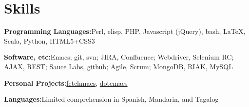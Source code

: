 \section{Skills}
%
\begin{position}
\item[] \textbf{Programming Languages:}\quad Perl, elisp, PHP, Javascript (jQuery), bash, \LaTeX, Scala, Python, HTML5+CSS3
\item[] \textbf{Software, etc:}\quad Emacs; git, svn; JIRA, Confluence; Webdriver, Selenium RC; AJAX, REST; \href{http://www.saucelabs.com}{Sauce Labs}, \href{http://www.github.com/gempesaw}{github}; Agile, Scrum; MongoDB, RIAK, MySQL
\item[] \textbf{Personal Projects:}\quad \href{http://github.com/gempesaw/fetchmacs}{fetchmacs}, \href{http://github.com/gempesaw/dotemacs}{dotemacs}
\item[] \textbf{Languages:}\quad Limited comprehension in Spanish, Mandarin, and Tagalog
\end{position}
